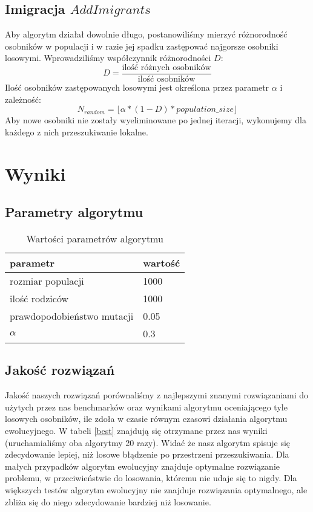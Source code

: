 \documentclass[11pt, a4wide]{article}
\begin{document}
\subsection{Imigracja $AddImigrants$}
Aby algorytm działał dowolnie długo, postanowiliśmy mierzyć różnorodność osobników w populacji i w razie jej
spadku zastępować najgorsze osobniki losowymi. Wprowadziliśmy współczynnik różnorodności $D$:
$$ D = \frac{\text{ilość różnych osobników}}{\text{ilość osobników}} $$
Ilość osobników zastępowanych losowymi jest określona przez parametr $\alpha$ i zależność:
$$ N_{random} = \lfloor \alpha * (1 - D) * population\_size  \rfloor $$
Aby nowe osobniki nie zostały wyeliminowane po jednej iteracji, wykonujemy dla każdego z nich przeszukiwanie
lokalne.






\section{Wyniki}
\subsection{Parametry algorytmu}

\begin{table}[H]
\caption{Wartości parametrów algorytmu}
\label{parametry}
\begin{center}
\begin{tabular}{|l|l|}
  \hline
  parametr & wartość \\
  \hline
  rozmiar populacji & 1000 \\
  ilość rodziców & 1000 \\
  prawdopodobieństwo mutacji & 0.05 \\
  $\alpha$ & 0.3 \\
  \hline
\end{tabular}
\end{center}
\end{table}





\subsection{Jakość rozwiązań}

Jakość naszych rozwiązań porównaliśmy z najlepszymi znanymi rozwiązaniami do
użytych przez nas benchmarków \cite{inst} oraz wynikami algorytmu oceniającego
tyle losowych osobników, ile zdoła w czasie równym czasowi działania algorytmu
ewolucyjnego.  W tabeli \ref{best} znajdują się otrzymane przez nas wyniki
(uruchamialiśmy oba algorytmy 20 razy).  Widać że nasz algorytm spisuje się
zdecydowanie lepiej, niż losowe błądzenie po przestrzeni przeszukiwania. Dla
małych przypadków algorytm ewolucyjny znajduje optymalne rozwiązanie problemu,
w przeciwieństwie do losowania, któremu nie udaje się to nigdy. Dla większych
testów algorytm ewolucyjny nie znajduje rozwiązania optymalnego, ale zbliża się do
niego zdecydowanie bardziej niż losowanie.
\end{document}
